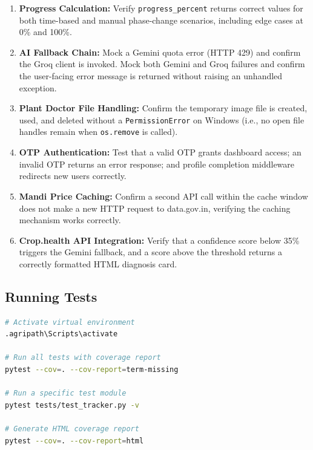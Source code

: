 \documentclass[12pt,a4paper]{article}
\begin{document}
\begin{enumerate}
    \item \textbf{Progress Calculation:} Verify \texttt{progress\_percent} returns correct values for both time-based and manual phase-change scenarios, including edge cases at 0\% and 100\%.
    \item \textbf{AI Fallback Chain:} Mock a Gemini quota error (HTTP 429) and confirm the Groq client is invoked. Mock both Gemini and Groq failures and confirm the user-facing error message is returned without raising an unhandled exception.
    \item \textbf{Plant Doctor File Handling:} Confirm the temporary image file is created, used, and deleted without a \texttt{PermissionError} on Windows (i.e., no open file handles remain when \texttt{os.remove} is called).
    \item \textbf{OTP Authentication:} Test that a valid OTP grants dashboard access; an invalid OTP returns an error response; and profile completion middleware redirects new users correctly.
    \item \textbf{Mandi Price Caching:} Confirm a second API call within the cache window does not make a new HTTP request to data.gov.in, verifying the caching mechanism works correctly.
    \item \textbf{Crop.health API Integration:} Verify that a confidence score below 35\% triggers the Gemini fallback, and a score above the threshold returns a correctly formatted HTML diagnosis card.
\end{enumerate}

\subsection*{Running Tests}

\begin{lstlisting}[language=bash, caption={Test Commands}]
# Activate virtual environment
.agripath\Scripts\activate

# Run all tests with coverage report
pytest --cov=. --cov-report=term-missing

# Run a specific test module
pytest tests/test_tracker.py -v

# Generate HTML coverage report
pytest --cov=. --cov-report=html
\end{lstlisting}

\end{document}
